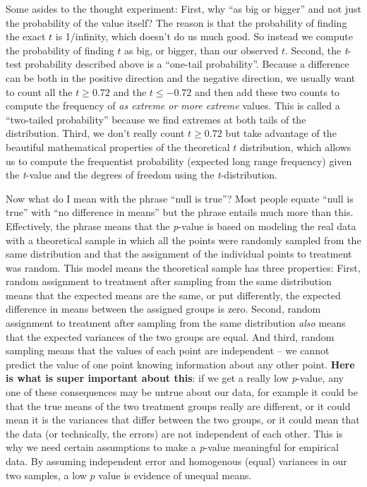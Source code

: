 \documentclass[]{book}
\begin{document}
Some asides to the thought experiment: First, why ``as big or bigger''
and not just the probability of the value itself? The reason is that the
probability of finding the exact \(t\) is 1/infinity, which doesn't do
us much good. So instead we compute the probability of finding \(t\) as
big, or bigger, than our observed \(t\). Second, the \emph{t}-test
probability described above is a ``one-tail probability''. Because a
difference can be both in the positive direction and the negative
direction, we usually want to count all the \(t \ge 0.72\) and the
\(t \le -0.72\) and then add these two counts to compute the frequency
of \emph{as extreme or more extreme} values. This is called a
``two-tailed probability'' because we find extremes at both tails of the
distribution. Third, we don't really count \(t \ge 0.72\) but take
advantage of the beautiful mathematical properties of the theoretical
\(t\) distribution, which allows us to compute the frequentist
probability (expected long range frequency) given the \emph{t}-value and
the degrees of freedom using the \emph{t}-distribution.

Now what do I mean with the phrase ``null is true''? Most people equate
``null is true'' with ``no difference in means'' but the phrase entails
much more than this. Effectively, the phrase means that the
\emph{p}-value is based on modeling the real data with a theoretical
sample in which all the points were randomly sampled from the same
distribution and that the assignment of the individual points to
treatment was random. This model means the theoretical sample has three
properties: First, random assignment to treatment after sampling from
the same distribution means that the expected means are the same, or put
differently, the expected difference in means between the assigned
groups is zero. Second, random assignment to treatment after sampling
from the same distribution \emph{also} means that the expected variances
of the two groups are equal. And third, random sampling means that the
values of each point are independent -- we cannot predict the value of
one point knowing information about any other point. \textbf{Here is
what is super important about this}: if we get a really low
\emph{p}-value, any one of these consequences may be untrue about our
data, for example it could be that the true means of the two treatment
groups really are different, or it could mean it is the variances that
differ between the two groups, or it could mean that the data (or
technically, the errors) are not independent of each other. This is why
we need certain assumptions to make a \emph{p}-value meaningful for
empirical data. By assuming independent error and homogenous (equal)
variances in our two samples, a low \(p\) value is evidence of unequal
means.
\end{document}

